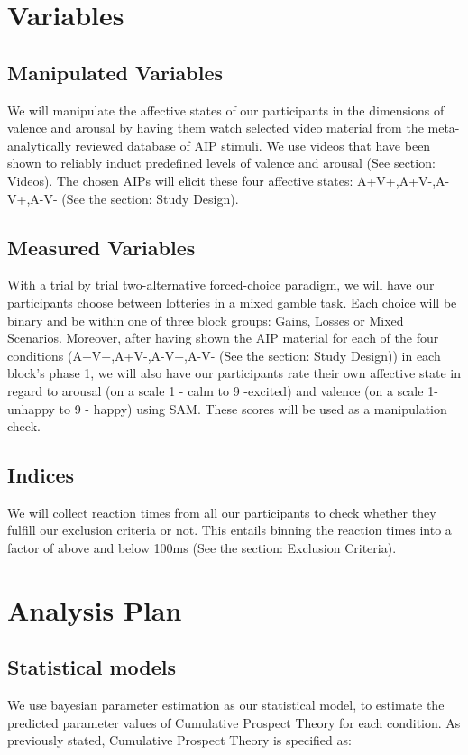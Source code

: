 \documentclass{article}
\begin{document}
    \section{Variables}

    \subsection{Manipulated Variables}
    We will manipulate the affective states of our participants in the dimensions of valence and arousal by having them watch selected video material from the meta-analytically reviewed database of AIP stimuli. We use videos that have been shown to reliably induct predefined levels of valence and arousal (See section: Videos). The chosen AIPs will elicit these four affective states: A+V+,A+V-,A-V+,A-V- (See the section: Study Design).

    \subsection{Measured Variables}
    With a trial by trial two-alternative forced-choice paradigm, we will have our participants choose between lotteries in a mixed gamble task. Each choice will be binary and be within one of three block groups: Gains, Losses or Mixed Scenarios.
    Moreover, after having shown the AIP material for each of the four conditions (A+V+,A+V-,A-V+,A-V- (See the section: Study Design)) in each block’s phase 1, we will also have our participants rate their own affective state in regard to arousal (on a scale 1 - calm to 9 -excited) and valence (on a scale 1-unhappy to 9 - happy) using SAM. These scores will be used as a manipulation check.

    \subsection{Indices}
    We will collect reaction times from all our participants to check whether they fulfill our exclusion criteria or not. This entails binning the reaction times into a factor of above and below 100ms (See the section: Exclusion Criteria).
    \section{Analysis Plan}
    \subsection{Statistical models}
    We use bayesian parameter estimation as our statistical model, to estimate the predicted parameter values of Cumulative Prospect Theory for each condition.
As previously stated, Cumulative Prospect Theory is specified as:
\end{document}
